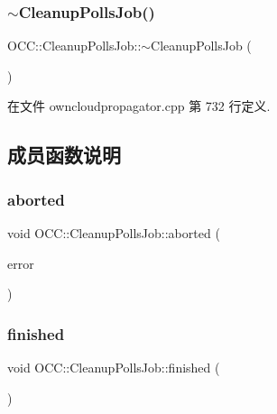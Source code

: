 \subsubsection{\texorpdfstring{$\sim$\+Cleanup\+Polls\+Job()}{~CleanupPollsJob()}}
{\footnotesize\ttfamily O\+C\+C\+::\+Cleanup\+Polls\+Job\+::$\sim$\+Cleanup\+Polls\+Job (\begin{DoxyParamCaption}{ }\end{DoxyParamCaption})}



在文件 owncloudpropagator.\+cpp 第 732 行定义.



\subsection{成员函数说明}
\mbox{\label{class_o_c_c_1_1_cleanup_polls_job_add22249d8b202739247de8287cc7dc60}} 
\subsubsection{\texorpdfstring{aborted}{aborted}}
{\footnotesize\ttfamily void O\+C\+C\+::\+Cleanup\+Polls\+Job\+::aborted (\begin{DoxyParamCaption}\item[{const Q\+String \&}]{error }\end{DoxyParamCaption})\hspace{0.3cm}{\ttfamily [signal]}}

\mbox{\label{class_o_c_c_1_1_cleanup_polls_job_ad6e089fb43c1896e22867cfffb011363}} 
\subsubsection{\texorpdfstring{finished}{finished}}
{\footnotesize\ttfamily void O\+C\+C\+::\+Cleanup\+Polls\+Job\+::finished (\begin{DoxyParamCaption}{ }\end{DoxyParamCaption})\hspace{0.3cm}{\ttfamily [signal]}}

